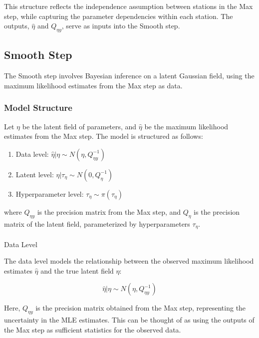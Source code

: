 \documentclass[
  letterpaper,
  DIV=11,
  numbers=noendperiod]{scrartcl}
\makeatletter
\let\oldparagraph\paragraph
\renewcommand{\paragraph}{
    \@ifstar
      \xxxParagraphStar
      \xxxParagraphNoStar
  }
\newcommand{\xxxParagraphStar}[1]{\oldparagraph*{#1}\mbox{}}
\newcommand{\xxxParagraphNoStar}[1]{\oldparagraph{#1}\mbox{}}
\providecommand{\tightlist}{%
  \setlength{\itemsep}{0pt}\setlength{\parskip}{0pt}}\usepackage{longtable,booktabs,array}
\makeatother
\begin{document}
This structure reflects the independence assumption between stations in
the Max step, while capturing the parameter dependencies within each
station. The outputs, \(\hat \eta\) and \(Q_{\eta y}\), serve as inputs
into the Smooth step.

\subsection{Smooth Step}\label{smooth-step}

The Smooth step involves Bayesian inference on a latent Gaussian field,
using the maximum likelihood estimates from the Max step as data.

\subsubsection{Model Structure}\label{model-structure}

Let \(\eta\) be the latent field of parameters, and \(\hat{\eta}\) be
the maximum likelihood estimates from the Max step. The model is
structured as follows:

\begin{enumerate}
\def\labelenumi{\arabic{enumi}.}
\tightlist
\item
  Data level: \(\hat{\eta} | \eta \sim N(\eta, Q_{\eta y}^{-1})\)
\item
  Latent level: \(\eta | \tau_\eta \sim N(0, Q_\eta^{-1})\)
\item
  Hyperparameter level: \(\tau_\eta \sim \pi(\tau_\eta)\)
\end{enumerate}

where \(Q_{\eta y}\) is the precision matrix from the Max step, and
\(Q_\eta\) is the precision matrix of the latent field, parameterized by
hyperparameters \(\tau_\eta\).

\paragraph{Data Level}\label{data-level}

The data level models the relationship between the observed maximum
likelihood estimates \(\hat{\eta}\) and the true latent field \(\eta\):

\[\hat{\eta} | \eta \sim N(\eta, Q_{\eta y}^{-1})\]

Here, \(Q_{\eta y}\) is the precision matrix obtained from the Max step,
representing the uncertainty in the MLE estimates. This can be thought
of as using the outputs of the Max step as sufficient statistics for the
observed data.
\end{document}
